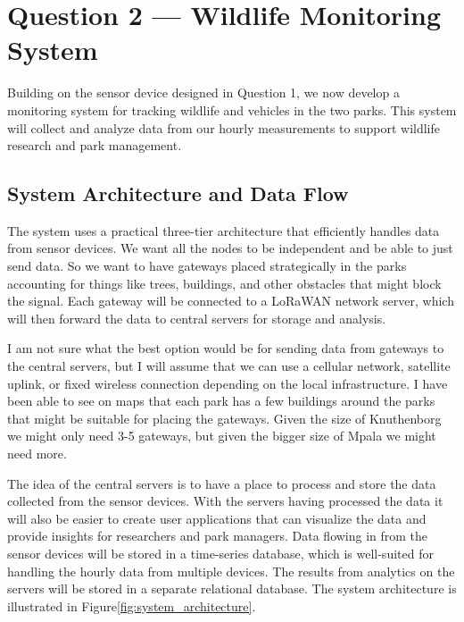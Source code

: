 \section{Question 2 --- Wildlife Monitoring System}

Building on the sensor device designed in Question 1, we now develop a monitoring system for tracking wildlife and vehicles in the two parks. This system will collect and analyze data from our hourly measurements to support wildlife research and park management.

\subsection{System Architecture and Data Flow}

The system uses a practical three-tier architecture that efficiently handles data from sensor devices. We want all the nodes to be independent and be able to just send data. So we want to have gateways placed strategically in the parks accounting for things like trees, buildings, and other obstacles that might block the signal. Each gateway will be connected to a LoRaWAN network server, which will then forward the data to central servers for storage and analysis. 

I am not sure what the best option would be for sending data from gateways to the central servers, but I will assume that we can use a cellular network, satellite uplink, or fixed wireless connection depending on the local infrastructure. I have been able to see on maps that each park has a few buildings around the parks that might be suitable for placing the gateways. Given the size of Knuthenborg we might only need 3-5 gateways, but given the bigger size of Mpala we might need more.

The idea of the central servers is to have a place to process and store the data collected from the sensor devices. With the servers having processed the data it will also be easier to create user applications that can visualize the data and provide insights for researchers and park managers. Data flowing in from the sensor devices will be stored in a time-series database, which is well-suited for handling the hourly data from multiple devices. The results from analytics on the servers will be stored in a separate relational database. The system architecture is illustrated in Figure\ref{fig:system_architecture}.   

